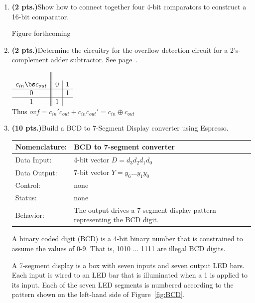 \begin{enumerate}
\item {\bf (2 pts.)}Show how to connect together four 4-bit comparators to
construct a 16-bit comparator.

	\begin{solution}{ Figure forthcoming} \end{solution}

\item {\bf (2 pts.)}Determine the circuitry for the overflow detection 
circuit for a 2's-complement adder subtractor.  See page~\pageref{page:Ovf}.

	\begin{solution}{
$\begin{array} {c||c|c} \\
 c_{in}  \bs c_{out} & 0 & 1 \\ \hline 
                0    &   & 1 \\ \hline
                1    & 1 &   \\
\end{array}$   \\
Thus $ovf = c_{in}' c_{out} + c_{in} c_{out}' =  c_{in} \oplus c_{out} $
} \end{solution}


\item {\bf (10 pts.)}Build a BCD to 7-Segment Display converter using 
Espresso.  

\label{page:7seg}
\begin{tabular}{|l|p{3.5in}|} \hline
Nomenclature:  & BCD to 7-segment converter                \\ \hline
Data Input:    & 4-bit vector $D=d_3 d_2 d_1 d_0$  \\ \hline
Data Output:   & 7-bit vector $Y=y_6 \ldots y_1 y_0$    \\ \hline
Control:       & none                                   \\ \hline
Status:        & none                                   \\ \hline
Behavior:      & The output drives a 7-segment display pattern
		 representing the BCD digit.  \\ \hline
\end{tabular}

A binary coded digit (BCD) is a 4-bit binary number that is constrained
to assume the values of 0-9. That is, 1010 ... 1111 are illegal BCD digits.

A 7-segment display is a box with seven inputs and seven output LED bars.  
Each input is wired to an LED bar that is illuminated when a 1 is applied 
to its input.
Each of the seven LED segments is numbered according to the pattern shown
on the left-hand side of Figure~\ref{fig:BCD}. 


\end{enumerate}

